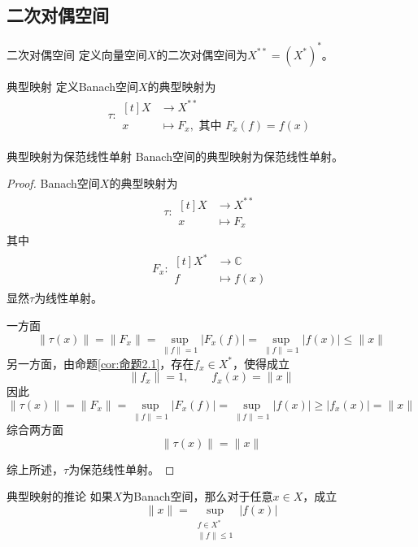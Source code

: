 \documentclass[lang = cn, scheme = chinese, thmcnt = section]{elegantbook}
\newcommand{\C}{\mathbb{C}}  		   %
\begin{document}
\subsection{二次对偶空间}

\begin{definition}{二次对偶空间}
	定义向量空间$X$的二次对偶空间为$X^{**}=(X^*)^*$。
\end{definition}

\begin{definition}{典型映射}
	定义Banach空间$X$的典型映射为
	\begin{align*}
		\tau:\begin{aligned}[t]
			X&\longrightarrow X^{**}\\
			x&\longmapsto F_x,\text{ 其中 }F_x(f)=f(x)
		\end{aligned}
	\end{align*}
\end{definition}

\begin{theorem}{}{典型映射为保范线性单射}
	Banach空间的典型映射为保范线性单射。
\end{theorem}

\begin{proof}
	Banach空间$X$的典型映射为
	\begin{align*}
		\tau:\begin{aligned}[t]
			X&\longrightarrow X^{**}\\
			x&\longmapsto F_x
		\end{aligned}
	\end{align*}
	其中
	\begin{align*}
		F_x:\begin{aligned}[t]
			X^*&\longrightarrow \C\\
			f&\longmapsto f(x)
		\end{aligned}
	\end{align*}
	显然$\tau$为线性单射。
	
	一方面
	$$
	\|\tau(x)\|=\|F_x\|=\sup_{\|f\|=1}|F_x(f)|
	=\sup_{\|f\|=1}|f(x)|
	\le \|x\|
	$$
	另一方面，由命题\ref{cor:命题2.1}，存在$f_x\in X^*$，使得成立
	$$
	\|f_x\|=1,\qquad f_x(x)=\|x\|
	$$
	因此
	$$
	\|\tau(x)\|=\|F_x\|=\sup_{\|f\|=1}|F_x(f)|
	=\sup_{\|f\|=1}|f(x)|
	\ge |f_x(x)|
	= \|x\|
	$$
	综合两方面
	$$
	\|\tau(x)\|=\|x\|
	$$
	
	综上所述，$\tau$为保范线性单射。
\end{proof}

\begin{corollary}{}{典型映射的推论}
	如果$X$为Banach空间，那么对于任意$x\in X$，成立
	$$
	\|x\|=\sup_{\substack{f\in X^*\\\|f\|\le 1}}|f(x)|
	$$
\end{corollary}
\end{document}
